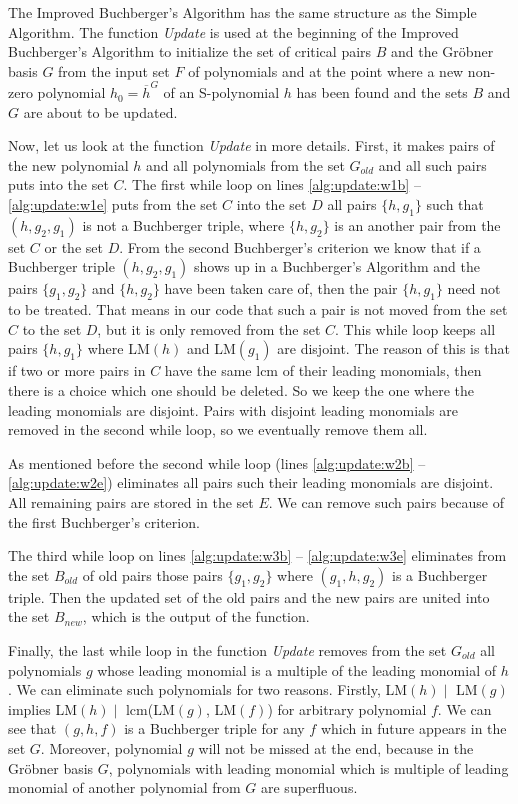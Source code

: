 The Improved Buchberger's Algorithm has the same structure as the Simple Algorithm. The function \textit{Update} is used at the beginning of the Improved Buchberger's Algorithm to initialize the set of critical pairs $B$ and the Gr\"obner basis $G$ from the input set $F$ of polynomials and at the point where a new non-zero polynomial $h_0 = \overline{h}^G$ of an S-polynomial $h$ has been found and the sets $B$ and $G$ are about to be updated.



Now, let us look at the function \textit{Update} in more details. First, it makes pairs of the new polynomial $h$ and all polynomials from the set $G_{old}$ and all such pairs puts into the set $C$. The first while loop on lines \ref{alg:update:w1b} -- \ref{alg:update:w1e} puts from the set $C$ into the set $D$ all pairs $\{h, g_1\}$ such that $(h, g_2, g_1)$ is not a Buchberger triple, where $\{h, g_2\}$ is an another pair from the set $C$ or the set $D$. From the second Buchberger's criterion we know that if a Buchberger triple $(h, g_2, g_1)$ shows up in a Buchberger's Algorithm and the pairs $\{g_1, g_2\}$ and $\{h, g_2\}$ have been taken care of, then the pair $\{h, g_1\}$ need not to be treated. That means in our code that such a pair is not moved from the set $C$ to the set $D$, but it is only removed from the set $C$. This while loop keeps all pairs $\{h, g_1\}$ where LM$(h)$ and LM$(g_1)$ are disjoint. The reason of this is that if two or more pairs in $C$ have the same lcm of their leading monomials, then there is a choice which one should be deleted. So we keep the one where the leading monomials are disjoint. Pairs with disjoint leading monomials are removed in the second while loop, so we eventually remove them all.

As mentioned before the second while loop (lines \ref{alg:update:w2b} -- \ref{alg:update:w2e}) eliminates all pairs such their leading monomials are disjoint. All remaining pairs are stored in the set $E$. We can remove such pairs because of the first Buchberger's criterion.

The third while loop on lines \ref{alg:update:w3b} -- \ref{alg:update:w3e} eliminates from the set $B_{old}$ of old pairs those pairs $\{g_1, g_2\}$ where $(g_1, h, g_2)$ is a Buchberger triple. Then the updated set of the old pairs and the new pairs are united into the set $B_{new}$, which is the output of the function.

Finally, the last while loop in the function \textit{Update} removes from the set $G_{old}$ all polynomials $g$ whose leading monomial is a multiple of the leading monomial of $h$. We can eliminate such polynomials for two reasons. Firstly, LM$(h) \mid$ LM$(g)$ implies LM$(h) \mid$ lcm(LM$(g)$, LM$(f)$) for arbitrary polynomial $f$. We can see that $(g, h, f)$ is a Buchberger triple for any $f$ which in future appears in the set $G$. Moreover, polynomial $g$ will not be missed at the end, because in the Gr\"obner basis $G$, polynomials with leading monomial which is multiple of leading monomial of another polynomial from $G$ are superfluous.

